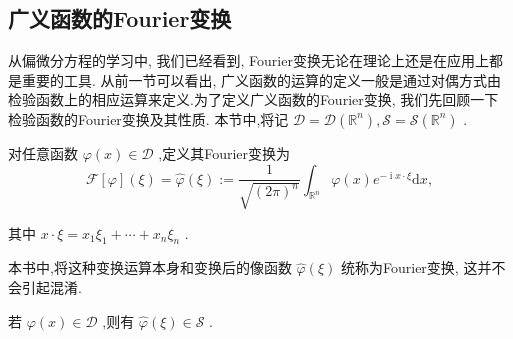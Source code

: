 \documentclass[lang=cn,newtx,10pt,scheme=chinese,thmcnt=chapter]{elegantbook}
\newcommand{\dif}{\mathrm{d}}
\newcommand{\ci}{\operatorname{i}}
\begin{document}
\subsection{广义函数的Fourier变换}

从偏微分方程的学习中, 我们已经看到, Fourier变换无论在理论上还是在应用上都是重要的工具. 从前一节可以看出, 广义函数的运算的定义一般是通过对偶方式由检验函数上的相应运算来定义.为了定义广义函数的Fourier变换, 我们先回顾一下检验函数的Fourier变换及其性质. 本节中,将记 \(\mathcal{D} = \mathcal{D}\left( {\mathbb{R}}^{n}\right) ,\mathcal{S} = \mathcal{S}\left( {\mathbb{R}}^{n}\right)\) .
\begin{definition}
  对任意函数 \(\varphi \left( x\right)  \in  \mathcal{D}\) ,定义其Fourier变换为
\begin{equation}
\mathcal{F}\left\lbrack  \varphi \right\rbrack  \left( \xi \right)  = \widehat{\varphi }\left( \xi \right)  \mathrel{\text{ := }} \frac{1}{\sqrt{{\left( 2\pi \right) }^{n}}}{\int }_{{\mathbb{R}}^{n}}\varphi \left( x\right) {e}^{-{\ci x} \cdot  \xi }{\dif x}, \label{3.10}
\end{equation}

其中 \(x \cdot  \xi  = {x}_{1}{\xi }_{1} + \cdots  + {x}_{n}{\xi }_{n}\) .

\end{definition}
\begin{note}
本书中,将这种变换运算本身和变换后的像函数 \(\widehat{\varphi }\left( \xi \right)\) 统称为Fourier变换, 这并不会引起混淆.
\end{note}
\begin{proposition}
  若 \(\varphi \left( x\right)  \in  \mathcal{D}\) ,则有 \(\widehat{\varphi }\left( \xi \right)  \in  \mathcal{S}\) .

\end{proposition}
\end{document}
